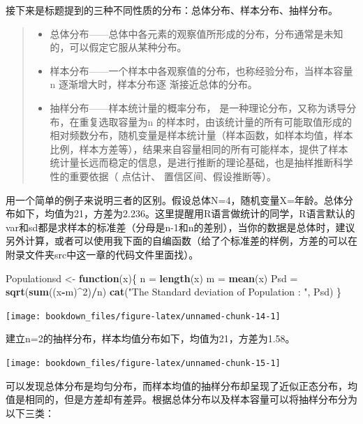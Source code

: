 \documentclass[]{ctexbook}
\newenvironment{Shaded}{\begin{snugshade}}{\end{snugshade}}
\newcommand{\ControlFlowTok}[1]{\textcolor[rgb]{0.13,0.29,0.53}{\textbf{#1}}}
\newcommand{\DecValTok}[1]{\textcolor[rgb]{0.00,0.00,0.81}{#1}}
\newcommand{\KeywordTok}[1]{\textcolor[rgb]{0.13,0.29,0.53}{\textbf{#1}}}
\newcommand{\NormalTok}[1]{#1}
\newcommand{\OperatorTok}[1]{\textcolor[rgb]{0.81,0.36,0.00}{\textbf{#1}}}
\newcommand{\StringTok}[1]{\textcolor[rgb]{0.31,0.60,0.02}{#1}}
\providecommand{\tightlist}{%
  \setlength{\itemsep}{0pt}\setlength{\parskip}{0pt}}
\begin{document}
接下来是标题提到的三种不同性质的分布：总体分布、样本分布、抽样分布。

\begin{quote}
\begin{itemize}
\tightlist
\item
  总体分布------总体中各元素的观察值所形成的分布，分布通常是未知的，可以假定它服从某种分布。
\item
  样本分布------一个样本中各观察值的分布，也称经验分布，当样本容量 n 逐渐增大时，样本分布逐
  渐接近总体的分布。
\item
  抽样分布------样本统计量的概率分布， 是一种理论分布，又称为诱导分布，在重复选取容量为n 的样本时，由该统计量的所有可能取值形成的相对频数分布，随机变量是样本统计量（样本函数，如样本均值，样本比例，样本方差等），结果来自容量相同的所有可能样本，提供了样本统计量长远而稳定的信息，是进行推断的理论基础，也是抽样推断科学性的重要依据（ 点估计、 置信区间、假设推断等）。
\end{itemize}
\end{quote}

用一个简单的例子来说明三者的区别。假设总体N=4，随机变量X=年龄。总体分布如下，均值为21，方差为2.236。这里提醒用R语言做统计的同学，R语言默认的var和sd都是求样本的标准差（分母是n-1和n的差别），当你的数据是总体时，建议另外计算，或者可以使用我下面的自编函数（给了个标准差的样例，方差的可以在附录文件夹src中这一章的代码文件里面找）。

\begin{Shaded}
\begin{Highlighting}[]
\NormalTok{Populationsd <-}\StringTok{ }\ControlFlowTok{function}\NormalTok{(x)\{}
\NormalTok{  n =}\StringTok{ }\KeywordTok{length}\NormalTok{(x)}
\NormalTok{  m =}\StringTok{ }\KeywordTok{mean}\NormalTok{(x)}
\NormalTok{  Psd =}\StringTok{ }\KeywordTok{sqrt}\NormalTok{(}\KeywordTok{sum}\NormalTok{((x}\OperatorTok{-}\NormalTok{m)}\OperatorTok{^}\DecValTok{2}\NormalTok{)}\OperatorTok{/}\NormalTok{n)}
  \KeywordTok{cat}\NormalTok{(}\StringTok{"The Standard deviation of Population : "}\NormalTok{, Psd)}
\NormalTok{\}}
\end{Highlighting}
\end{Shaded}

\texttt{[image: bookdown\_files/figure-latex/unnamed-chunk-14-1]}

建立n=2的抽样分布，样本均值分布如下，均值为21，方差为1.58。

\texttt{[image: bookdown\_files/figure-latex/unnamed-chunk-15-1]}

可以发现总体分布是均匀分布，而样本均值的抽样分布却呈现了近似正态分布，均值是相同的，但是方差却有差异。根据总体分布以及样本容量可以将抽样分布分为以下三类：
\end{document}
